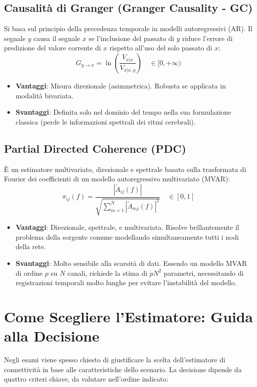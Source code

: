 \documentclass[10pt, letterpaper]{report}
\begin{document}
\subsection{Causalità di Granger (Granger Causality - GC)}
Si basa sul principio della precedenza temporale in modelli autoregressivi (AR).
Il segnale $y$ causa il segnale $x$ se l'inclusione del passato di $y$ riduce l'errore di predizione del valore corrente di $x$ rispetto all'uso del solo passato di $x$:
\[
G_{y \to x} = \ln\left( \frac{V_{x|x}}{V_{x|x,y}} \right) \quad \in [0, +\infty)
\]
\begin{itemize}
    \item \textbf{Vantaggi}: Misura direzionale (asimmetrica).
    Robusta se applicata in modalità bivariata.
    \item \textbf{Svantaggi}: Definita solo nel dominio del tempo nella sua formulazione classica (perde le informazioni spettrali dei ritmi cerebrali).
\end{itemize}

\subsection{Partial Directed Coherence (PDC)}
È un estimatore multivariato, direzionale e spettrale basato sulla trasformata di Fourier dei coefficienti di un modello autoregressivo multivariato (MVAR):
\[
\pi_{ij}(f) = \frac{|\tilde{A}_{ij}(f)|}{\sqrt{\sum_{m=1}^N |\tilde{A}_{mj}(f)|^2}} \quad \in [0, 1]
\]
\begin{itemize}
    \item \textbf{Vantaggi}: Direzionale, spettrale, e multivariata.
    Risolve brillantemente il problema della sorgente comune modellando simultaneamente tutti i nodi della rete.
    \item \textbf{Svantaggi}: Molto sensibile alla scarsità di dati. Essendo un modello MVAR di ordine $p$ su $N$ canali, richiede la stima di $p N^2$ parametri, necessitando di registrazioni temporali molto lunghe per evitare l'instabilità del modello.
\end{itemize}


\section{Come Scegliere l'Estimatore: Guida alla Decisione}

Negli esami viene spesso chiesto di giustificare la scelta dell'estimatore di connettività in base alle caratteristiche dello scenario.
La decisione dipende da quattro criteri chiave, da valutare nell'ordine indicato:
\end{document}
